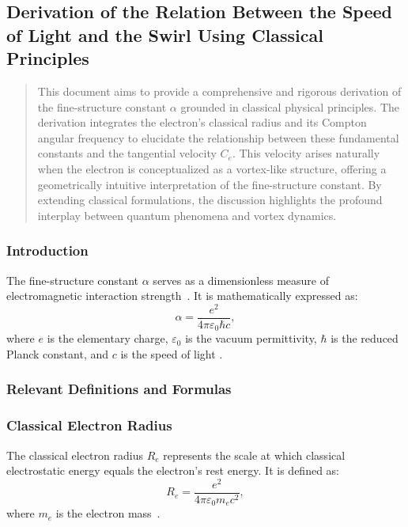 
\subsection{Derivation of the Relation Between the Speed of Light and the Swirl Using Classical Principles}\label{subsec:derivation-of-the-relation-between-the-speed-of-light-and-the-swirl-using-classical-principles}

\begin{abstract}
    This document aims to provide a comprehensive and rigorous derivation of the fine-structure constant $\alpha$ grounded in classical physical principles.
    The derivation integrates the electron's classical radius and its Compton angular frequency to elucidate the relationship between these fundamental constants and the tangential velocity $C_e$.
    This velocity arises naturally when the electron is conceptualized as a vortex-like structure, offering a geometrically intuitive interpretation of the fine-structure constant.
    By extending classical formulations, the discussion highlights the profound interplay between quantum phenomena and vortex dynamics.
\end{abstract}

\subsubsection{Introduction}
The fine-structure constant $\alpha$ serves as a dimensionless measure of electromagnetic interaction strength~\cite{maxwell1861}. It is mathematically expressed as:
\begin{equation}
    \alpha = \frac{e^2}{4\pi \varepsilon_0 \hbar c},
\end{equation}
where $e$ is the elementary charge, $\varepsilon_0$ is the vacuum permittivity, $\hbar$ is the reduced Planck constant, and $c$ is the speed of light \cite{dirac1930quantum}.

\subsubsection{Relevant Definitions and Formulas}
\subsubsection{Classical Electron Radius}
The classical electron radius $R_e$ represents the scale at which classical electrostatic energy equals the electron’s rest energy. It is defined as:
\begin{equation}
    R_e = \frac{e^2}{4\pi \varepsilon_0 m_e c^2},
\end{equation}
where $m_e$ is the electron mass~\cite{helmholtz1858}.

